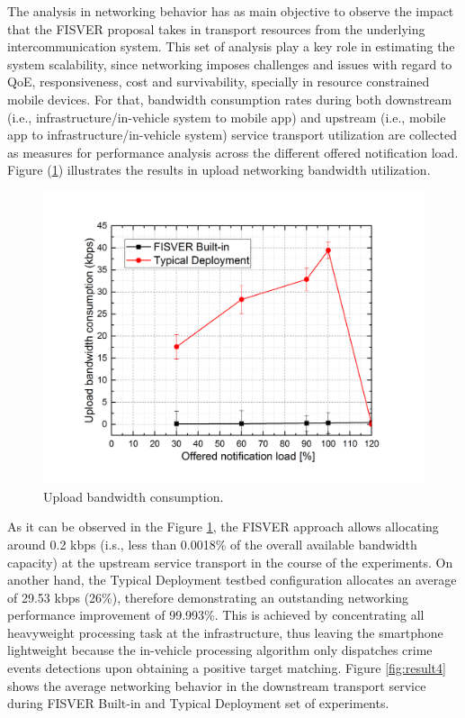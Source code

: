 The analysis in networking behavior has as main objective to observe the impact that the FISVER proposal takes in transport resources from the underlying intercommunication system. This set of analysis play a key role in estimating the system scalability, since networking imposes challenges and issues with regard to QoE, responsiveness, cost and survivability, specially in resource constrained mobile devices. For that, bandwidth consumption rates during both downstream (i.e., infrastructure/in-vehicle system to mobile app) and upstream (i.e., mobile app to infrastructure/in-vehicle system) service transport utilization are collected as measures for performance analysis across the different offered notification load. Figure (\ref{fig:result3}) illustrates the results in upload networking bandwidth utilization. 

\begin{figure}[htb]
	\centering
 	\includegraphics[scale=0.60]{Imagens/cap5_upload.png}
 	\caption{Upload bandwidth consumption.}
 	\label{fig:result3}
\end{figure}

As it can be observed in the Figure \ref{fig:result3}, the FISVER approach allows allocating around 0.2 kbps (i.s., less than 0.0018\% of the overall available bandwidth capacity) at the upstream service transport in the course of the experiments. On another hand, the Typical Deployment testbed configuration allocates an average of 29.53 kbps (26\%), therefore demonstrating an outstanding networking performance improvement of 99.993\%. This is achieved by concentrating all heavyweight processing task at the infrastructure, thus leaving the smartphone lightweight because the in-vehicle processing algorithm only dispatches crime events detections upon obtaining a positive target matching. Figure \ref{fig:result4} shows the average networking behavior in the downstream transport service during FISVER Built-in and Typical Deployment set of experiments.

